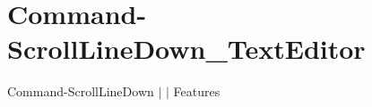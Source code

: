 \chapter{Command-\/\+Scroll\+Line\+Down\+\_\+\+Text\+Editor }
\hypertarget{md__docs_2_text_editor_2_features_2_command-_scroll_line_down___text_editor}{}\label{md__docs_2_text_editor_2_features_2_command-_scroll_line_down___text_editor}
Command-\/\+Scroll\+Line\+Down \texorpdfstring{$\vert$}{|}  \texorpdfstring{$\vert$}{|} Features



 